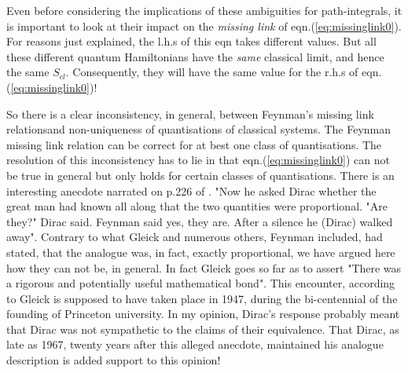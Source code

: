 \documentclass[a4paper]{JHEP3}
\newcommand{\be}{\begin{equation}}
\newcommand{\ee}{\end{equation}}
\begin{document}
Even before considering the implications of these ambiguities for path-integrals, it is important to look at their impact on the \emph{missing link} of eqn.(\ref{eq:missinglink0}). For reasons just explained, the l.h.s of this eqn  takes different values. But all these different
quantum Hamiltonians have the \emph{same} classical limit, and hence the same $S_{cl}$. Consequently, they will have the same value for
the r.h.s of eqn.(\ref{eq:missinglink0})! 

So there is a clear inconsistency, in general, between Feynman's  missing link relationsand non-uniqueness of quantisations of classical 
systems. 
The Feynman missing link relation can be correct for at best one class of quantisations. 
The resolution of this inconsistency has to lie in that eqn.(\ref{eq:missinglink0}) can not be true in general but only holds for certain 
classes of quantisations.  There is an interesting anecdote narrated on p.226 of \cite{gleick}. "Now he asked Dirac whether the great man 
had known all along that the
two quantities were proportional. "Are they?" Dirac said. Feynman said yes, they are. After a silence he (Dirac) walked away". Contrary to
what Gleick and numerous others, Feynman included, had stated, that the analogue was, in fact, exactly proportional, we have argued here 
how they can not be, in general. In fact Gleick goes so far as to assert "There was a rigorous and potentially useful mathematical bond".
This encounter, according to Gleick is supposed to have taken place in 1947, during the bi-centennial of the founding of Princeton university.
In my opinion, Dirac's response probably meant that Dirac was not sympathetic to the claims of their equivalence. That Dirac, as late as 1967,
twenty years after this alleged anecdote, maintained his analogue description \cite{diracbook4r} is added support to this opinion!
\end{document}
